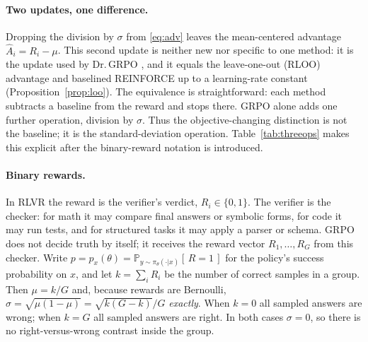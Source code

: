 \documentclass[11pt]{article}
\theoremstyle{plain}
\theoremstyle{definition}
\newcommand{\Prob}{\mathbb{P}}
\newcommand{\Adv}{\hat{A}}
\begin{document}
\paragraph{Two updates, one difference.} Dropping the division by $\sigma$ from \eqref{eq:adv} leaves the mean-centered advantage $\Adv_i=R_i-\mu$. This second update is neither new nor specific to one method: it is the update used by Dr.\,GRPO \citep{liu2025drgrpo}, and it equals the leave-one-out (RLOO) advantage \citep{ahmadian2024rloo,kool2019buy} and baselined REINFORCE \citep{williams1992reinforce} up to a learning-rate constant (Proposition~\ref{prop:loo}). The equivalence is straightforward: each method subtracts a baseline from the reward and stops there. GRPO alone adds one further operation, division by $\sigma$. Thus the objective-changing distinction is not the baseline; it is the standard-deviation operation. Table~\ref{tab:threeops} makes this explicit after the binary-reward notation is introduced.

\paragraph{Binary rewards.} In RLVR the reward is the verifier's verdict, $R_i\in\{0,1\}$. The verifier is the checker: for math it may compare final answers or symbolic forms, for code it may run tests, and for structured tasks it may apply a parser or schema. GRPO does not decide truth by itself; it receives the reward vector $R_1,\dots,R_G$ from this checker. Write $p=p_x(\theta)=\Prob_{y\sim\pi_\theta(\cdot|x)}[\,R=1\,]$ for the policy's success probability on $x$, and let $k=\sum_i R_i$ be the number of correct samples in a group. Then $\mu=k/G$ and, because rewards are Bernoulli, $\sigma=\sqrt{\mu(1-\mu)}=\sqrt{k(G-k)}/G$ \emph{exactly}. When $k=0$ all sampled answers are wrong; when $k=G$ all sampled answers are right. In both cases $\sigma=0$, so there is no right-versus-wrong contrast inside the group.
\end{document}
